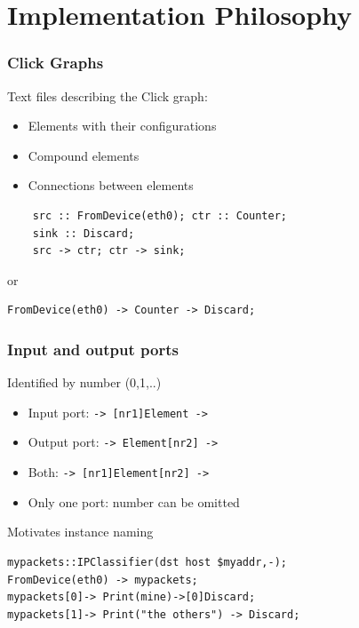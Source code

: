 \documentclass{beamer}
\begin{document}
\section{Implementation Philosophy} %
\label{sec:implementation}
\begin{frame}[fragile]
\frametitle{Click Graphs}
Text files describing the Click graph:
\begin{itemize}
	\item Elements with their configurations
	\item Compound elements
	\item Connections between elements
\end{itemize}
\begin{lstlisting}
	src :: FromDevice(eth0); ctr :: Counter; 
	sink :: Discard; 
	src -> ctr; ctr -> sink;
\end{lstlisting}
or
\begin{lstlisting}
FromDevice(eth0) -> Counter -> Discard;
\end{lstlisting}
\end{frame}
% 
% 

\begin{frame}[fragile]
\frametitle{Input and output ports}
Identified by number (0,1,..)
\begin{itemize}
	\item Input port:	\lstinline!-> [nr1]Element ->!
	\item Output port: \lstinline!-> Element[nr2] ->!
	\item  Both: \lstinline!-> [nr1]Element[nr2] ->!
	\item  Only one port: number can be omitted
\end{itemize}
Motivates instance naming
\begin{lstlisting}
mypackets::IPClassifier(dst host $myaddr,-);
FromDevice(eth0) -> mypackets;
mypackets[0]-> Print(mine)->[0]Discard;
mypackets[1]-> Print("the others") -> Discard;
\end{lstlisting}
\end{frame}
\end{document}
